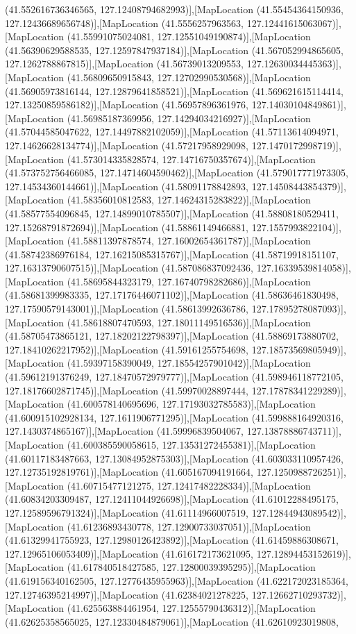 (41.552616736346565, 127.12408794682993)],[MapLocation (41.55454364150936, 127.12436689656748)],[MapLocation (41.5556257963563, 127.12441615063067)],[MapLocation (41.55991075024081, 127.12551049190874)],[MapLocation (41.56390629588535, 127.12597847937184)],[MapLocation (41.567052994865605, 127.1262788867815)],[MapLocation (41.56739013209553, 127.12630034445363)],[MapLocation (41.56809650915843, 127.12702990530568)],[MapLocation (41.56905973816144, 127.12879641858521)],[MapLocation (41.569621615114414, 127.13250859586182)],[MapLocation (41.56957896361976, 127.14030104849861)],[MapLocation (41.56985187369956, 127.14294034216927)],[MapLocation (41.57044585047622, 127.14497882102059)],[MapLocation (41.57113614094971, 127.14626628134774)],[MapLocation (41.57217958929098, 127.1470172998719)],[MapLocation (41.573014335828574, 127.14716750357674)],[MapLocation (41.573752756466085, 127.14714604590462)],[MapLocation (41.579017771973305, 127.14534360144661)],[MapLocation (41.58091178842893, 127.14508443854379)],[MapLocation (41.58356010812583, 127.14624315283822)],[MapLocation (41.58577554096845, 127.14899010785507)],[MapLocation (41.58808180529411, 127.15268791872694)],[MapLocation (41.58861149466881, 127.1557993822104)],[MapLocation (41.58811397878574, 127.16002654361787)],[MapLocation (41.58742386976184, 127.16215085315767)],[MapLocation (41.58719918151107, 127.16313790607515)],[MapLocation (41.587086837092436, 127.16339539814058)],[MapLocation (41.58695844323179, 127.16740798282686)],[MapLocation (41.58681399983335, 127.17176446071102)],[MapLocation (41.58636461830498, 127.17590579143001)],[MapLocation (41.58613992636786, 127.17895278087093)],[MapLocation (41.58618807470593, 127.18011149516536)],[MapLocation (41.58705473865121, 127.18202122798397)],[MapLocation (41.58869173880702, 127.18410262217952)],[MapLocation (41.59161255754698, 127.18573569805949)],[MapLocation (41.59397158390049, 127.18554257901042)],[MapLocation (41.59612191376249, 127.18470572979777)],[MapLocation (41.598946118772105, 127.18176602871745)],[MapLocation (41.59970028897444, 127.17878341229289)],[MapLocation (41.600578140695696, 127.17193032785583)],[MapLocation (41.600915102928134, 127.1611906771295)],[MapLocation (41.599888164920316, 127.1430374865167)],[MapLocation (41.59996839504067, 127.13878886743711)],[MapLocation (41.600385590058615, 127.13531272455381)],[MapLocation (41.60117183487663, 127.13084952875303)],[MapLocation (41.603033110957426, 127.12735192819761)],[MapLocation (41.605167094191664, 127.1250988726251)],[MapLocation (41.60715477121275, 127.12417482228334)],[MapLocation (41.60834203309487, 127.12411044926698)],[MapLocation (41.61012288495175, 127.12589596791324)],[MapLocation (41.61114966007519, 127.12844943089542)],[MapLocation (41.61236893430778, 127.12900733037051)],[MapLocation (41.61329941755923, 127.12980126423892)],[MapLocation (41.61459886308671, 127.12965106053409)],[MapLocation (41.616172173621095, 127.12894453152619)],[MapLocation (41.617840518427585, 127.12800039395295)],[MapLocation (41.619156340162505, 127.12776435955963)],[MapLocation (41.622172023185364, 127.12746395214997)],[MapLocation (41.62384021278225, 127.12662710293732)],[MapLocation (41.625563884461954, 127.12555790436312)],[MapLocation (41.62625358565025, 127.12330484879061)],[MapLocation (41.62610923019808, 